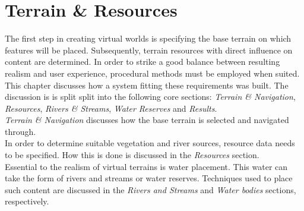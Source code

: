 \chapter{Terrain \& Resources}

The first step in creating virtual worlds is specifying the base terrain on which features will be placed. Subsequently, terrain resources with direct influence on content are determined. In order to strike a good balance between resulting realism and user experience, procedural methods must be employed when suited.\\
This chapter discusses how a system fitting these requirements was built. The discussion is is split split into the following core sections: \textit{Terrain \& Navigation}, \textit{Resources}, \textit{Rivers \& Streams}, \textit{Water Reserves} and \textit{Results}.\\
\textit{Terrain \& Navigation} discusses how the base terrain is selected and navigated through. \\
In order to determine suitable vegetation and river sources, resource data needs to be specified. How this is done is discussed in the \textit{Resources} section.\\
Essential to the realism of virtual terrains is water placement. This water can take the form of rivers and streams or water reserves. Techniques used to place such content are discussed in the \textit{Rivers and Streams} and \textit{Water bodies} sections, respectively. \\

